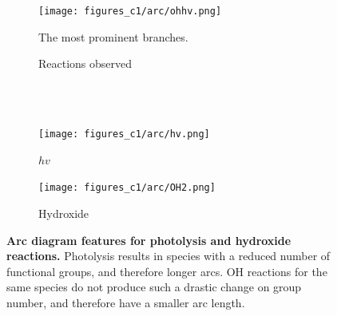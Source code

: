\begin{figure}[H]
     \centering
      \begin{subfigure}[b]{.4\textwidth}
         \centering
         \texttt{[image: figures\_c1/arc/ohhv.png]}
         \caption{The most prominent branches. }
         \label{fig:ohhv}
     \end{subfigure}
      \begin{subfigure}[b]{.4\textwidth}
         \centering
    \hfill
         \caption{Reactions observed}
         \label{fig:rxnohhv}
     \end{subfigure}
     \\ \ \\
     \begin{subfigure}[b]{.4\textwidth}
         \centering
         \texttt{[image: figures\_c1/arc/hv.png]}
         \caption{$hv$}
         \label{fig:hv}
     \end{subfigure}
     \begin{subfigure}[b]{.4\textwidth}
         \centering
         \texttt{[image: figures\_c1/arc/OH2.png]}
         \caption{Hydroxide}
         \label{fig:oh2}
     \end{subfigure}
      \caption{\textbf{ Arc diagram features for photolysis and  hydroxide reactions.  } Photolysis results in species with a reduced number of functional groups, and therefore longer arcs. OH reactions for the same species do not produce such a drastic change on group number, and therefore have a smaller arc length.}
        \label{fig:wholeohhv}
\end{figure}



